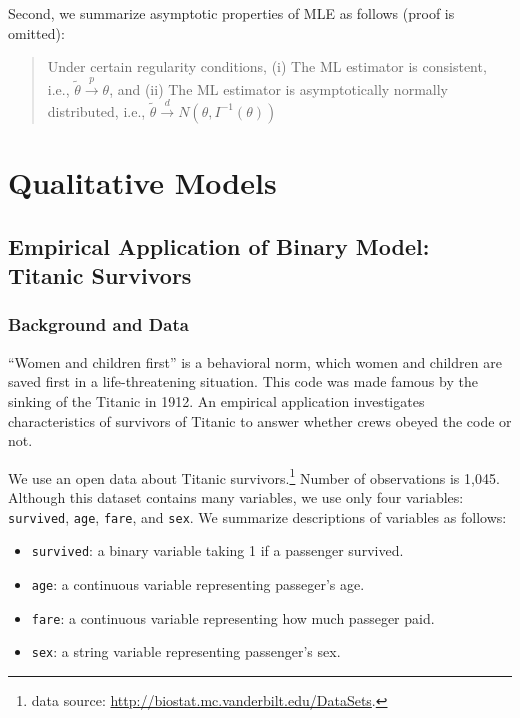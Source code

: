 \documentclass[
  12pt,
]{article}
\providecommand{\tightlist}{%
  \setlength{\itemsep}{0pt}\setlength{\parskip}{0pt}}
\begin{document}
Second, we summarize asymptotic properties of MLE as follows (proof is omitted):

\begin{quote}
Under certain regularity conditions,
(i) The ML estimator is consistent, i.e., \(\tilde{\theta} \overset{p}{\to} \theta\), and
(ii) The ML estimator is asymptotically normally distributed, i.e., \(\tilde{\theta} \overset{d}{\to} N(\theta, I^{-1}(\theta))\)
\end{quote}

\hypertarget{qualitative-models}{%
\section{Qualitative Models}\label{qualitative-models}}

\hypertarget{empirical-application-of-binary-model-titanic-survivors}{%
\subsection{Empirical Application of Binary Model: Titanic Survivors}\label{empirical-application-of-binary-model-titanic-survivors}}

\hypertarget{background-and-data}{%
\subsubsection{Background and Data}\label{background-and-data}}

``Women and children first'' is a behavioral norm,
which women and children are saved first in a life-threatening situation.
This code was made famous by the sinking of the Titanic in 1912.
An empirical application investigates characteristics of survivors of Titanic
to answer whether crews obeyed the code or not.

We use an open data about Titanic survivors.\footnote{data source: \url{http://biostat.mc.vanderbilt.edu/DataSets}.}
Number of observations is 1,045.
Although this dataset contains many variables,
we use only four variables: \texttt{survived}, \texttt{age}, \texttt{fare}, and \texttt{sex}.
We summarize descriptions of variables as follows:

\begin{itemize}
\tightlist
\item
  \texttt{survived}: a binary variable taking 1 if a passenger survived.
\item
  \texttt{age}: a continuous variable representing passeger's age.
\item
  \texttt{fare}: a continuous variable representing how much passeger paid.
\item
  \texttt{sex}: a string variable representing passenger's sex.
\end{itemize}
\end{document}

